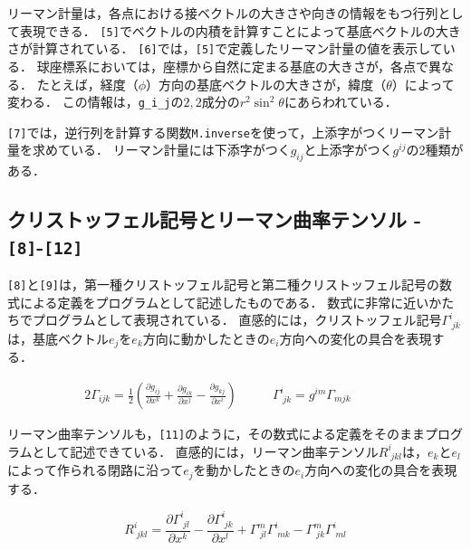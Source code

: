 リーマン計量は，各点における接ベクトルの大きさや向きの情報をもつ行列として表現できる．
\texttt{[5]}でベクトルの内積を計算すことによって基底ベクトルの大きさが計算されている．
\texttt{[6]}では，\texttt{[5]}で定義したリーマン計量の値を表示している．
球座標系においては，座標から自然に定まる基底の大きさが，各点で異なる．
たとえば，経度（$\phi$）方向の基底ベクトルの大きさが，緯度（$\theta$）によって変わる．
この情報は，\lstinline|g_i_j|の$2,2$成分の$r^2 \sin^2 \theta$にあらわれている．

\texttt{[7]}では，逆行列を計算する関数\lstinline{M.inverse}を使って，上添字がつくリーマン計量を求めている．
リーマン計量には下添字がつく$g_{ij}$と上添字がつく$g^{ij}$の2種類がある．

\subsection{クリストッフェル記号とリーマン曲率テンソル - \texttt{[8]}-\texttt{[12]}}



\texttt{[8]}と\texttt{[9]}は，第一種クリストッフェル記号と第二種クリストッフェル記号の数式による定義をプログラムとして記述したものである．
数式に非常に近いかたちでプログラムとして表現されている．
直感的には，クリストッフェル記号$\Gamma^{i}_{\;jk}$は，基底ベクトル$e_j$を$e_k$方向に動かしたときの$e_i$方向への変化の具合を表現する．

\begin{alignat*}{2}
\Gamma_{ijk} = \frac{1}{2} (\frac{\partial g_{ij}}{\partial x^k} + \frac{\partial g_{ik}}{\partial x^j} - \frac{\partial g_{kj}}{\partial x^i}) &\qquad
\Gamma^{i}_{\;jk} = g^{im} \Gamma_{mjk} &\qquad
\end{alignat*}

リーマン曲率テンソルも，\texttt{[11]}のように，その数式による定義をそのままプログラムとして記述できている．
直感的には，リーマン曲率テンソル$R^{i}_{\;jkl}$は，$e_k$と$e_l$によって作られる閉路に沿って$e_j$を動かしたときの$e_i$方向への変化の具合を表現する．

\[R^{i}_{\;jkl} = \frac{\partial \Gamma^{i}_{\;jl}}{\partial x^k} - \frac{\partial \Gamma^{i}_{\;jk}}{\partial x^l} + \Gamma^{m}_{\;jl} \Gamma^{i}_{\;mk} - \Gamma^{m}_{\;jk} \Gamma^{i}_{\;ml} \]

